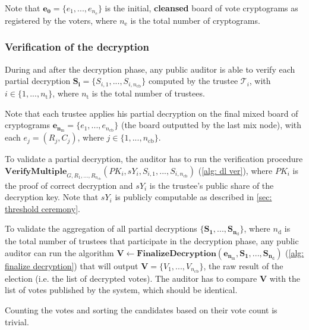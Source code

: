 Note that $\boldsymbol{e_0} = \{ e_1, ..., e_{n_\mathrm{e}} \}$ is the initial, \textbf{cleansed} board of vote cryptograms as registered by the voters, where $n_\mathrm{e}$ is the total number of cryptograms. 


\subsubsection{Verification of the decryption}
During and after the decryption phase, any public auditor is able to verify each partial decryption \( \boldsymbol{S_i} = \{ S_{i,1}, ..., S_{i,n_\mathrm{cb}} \} \) computed by the trustee $\mathcal{T}_i$, with \( i \in \{ 1, ..., n_\mathrm{t} \} \), where $n_\mathrm{t}$ is the total number of trustees. 

Note that each trustee applies his partial decryption on the final mixed board of cryptograms \( \boldsymbol{e_{n_\mathrm{m}}} = \{ e_1, ..., e_{n_\mathrm{cb}} \} \) (the board outputted by the last mix node), with each \( e_j = (R_j, C_j) \), where \( j \in \{ 1, ..., n_\mathrm{cb} \} \).

To validate a partial decryption, the auditor has to run the verification procedure \( \mathbf{VerifyMultiple}_{G, R_1, ..., R_{n_\mathrm{cb}}} (PK_i, sY_i, S_{i,1}, ..., S_{i,n_\mathrm{cb}}) \) (\cref{alg: dl ver}), where $PK_i$ is the proof of correct decryption and $sY_i$ is the trustee's public share of the decryption key. Note that $sY_i$ is publicly computable as described in \cref{sec: threshold ceremony}.

To validate the aggregation of all partial decryptions \( \{\boldsymbol{S_1}, ..., \boldsymbol{S_{n_\mathrm{d}}}\} \), where $n_\mathrm{d}$ is the total number of trustees that participate in the decryption phase, any public auditor can run the algorithm \( \boldsymbol{V} \leftarrow \mathbf{FinalizeDecryption} (\boldsymbol{e_{n_\mathrm{m}}}, \boldsymbol{S_1}, ..., \boldsymbol{S_{n_\mathrm{d}}}) \) (\cref{alg: finalize decryption}) that will output \( \boldsymbol{V} = \{ V_1, ..., V_{n_\mathrm{cb}} \} \), the raw result of the election (i.e. the list of decrypted votes). The auditor has to compare $\boldsymbol{V}$ with the list of votes published by the system, which should be identical.

Counting the votes and sorting the candidates based on their vote count is trivial.
